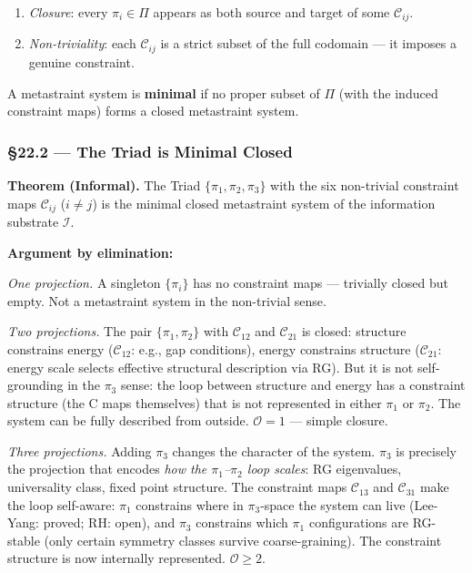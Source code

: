 \documentclass[12pt,a4paper]{article}
\newcommand{\pilcrow}{\S}
\begin{document}
\begin{enumerate}
    \item \emph{Closure}: every $\pi_i \in \Pi$ appears as both source and target of some $\mathcal{C}_{ij}$.
    \item \emph{Non-triviality}: each $\mathcal{C}_{ij}$ is a strict subset of the full codomain --- it imposes a genuine constraint.
\end{enumerate}

A metastraint system is \textbf{minimal} if no proper subset of $\Pi$ (with the induced constraint maps) forms a closed metastraint system.

\subsubsection{\pilcrow{}22.2 --- The Triad is Minimal Closed}

\textbf{Theorem (Informal).} The Triad $\{\pi_1, \pi_2, \pi_3\}$ with the six non-trivial constraint maps $\mathcal{C}_{ij}$ ($i \neq j$) is the minimal closed metastraint system of the information substrate $\mathcal{I}$.

\textbf{Argument by elimination:}

\emph{One projection.} A singleton $\{\pi_i\}$ has no constraint maps --- trivially closed but empty. Not a metastraint system in the non-trivial sense.

\emph{Two projections.} The pair $\{\pi_1, \pi_2\}$ with $\mathcal{C}_{12}$ and $\mathcal{C}_{21}$ is closed: structure constrains energy ($\mathcal{C}_{12}$: e.g., gap conditions), energy constrains structure ($\mathcal{C}_{21}$: energy scale selects effective structural description via RG). But it is not self-grounding in the $\pi_3$ sense: the loop between structure and energy has a constraint structure (the C maps themselves) that is not represented in either $\pi_1$ or $\pi_2$. The system can be fully described from outside. $\mathcal{O} = 1$ --- simple closure.

\emph{Three projections.} Adding $\pi_3$ changes the character of the system. $\pi_3$ is precisely the projection that encodes \emph{how the $\pi_1$--$\pi_2$ loop scales}: RG eigenvalues, universality class, fixed point structure. The constraint maps $\mathcal{C}_{13}$ and $\mathcal{C}_{31}$ make the loop self-aware: $\pi_1$ constrains where in $\pi_3$-space the system can live (Lee-Yang: proved; RH: open), and $\pi_3$ constrains which $\pi_1$ configurations are RG-stable (only certain symmetry classes survive coarse-graining). The constraint structure is now internally represented. $\mathcal{O} \geq 2$.
\end{document}

